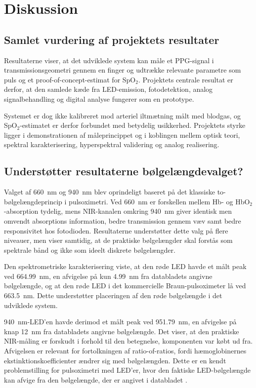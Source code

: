 \chapter{Diskussion}
\label{chap:diskussion}

\section{Samlet vurdering af projektets resultater}
Resultaterne viser, at det udviklede system kan måle et PPG-signal i transmissionsgeometri gennem en finger og udtrække relevante parametre som puls og et proof-of-concept-estimat for SpO$_2$. Projektets centrale resultat er derfor, at den samlede kæde fra LED-emission, fotodetektion, analog signalbehandling og digital analyse fungerer som en prototype.

Systemet er dog ikke kalibreret mod arteriel iltmætning målt med blodgas, og SpO$_2$-estimatet er derfor forbundet med betydelig usikkerhed. Projektets styrke ligger i demonstrationen af måleprincippet og i koblingen mellem optisk teori, spektral karakterisering, hyperspektral validering og analog realisering.

\section{Understøtter resultaterne bølgelængdevalget?}
Valget af \SI{660}{nm} og \SI{940}{nm} blev oprindeligt baseret på det klassiske to-bølgelængdeprincip i pulsoximetri. Ved \SI{660}{nm} er forskellen mellem Hb- og HbO$_2$-absorption tydelig, mens NIR-kanalen omkring \SI{940}{nm} giver identisk men omvendt absorptions information, bedre transmission gennem væv samt bedre responsivitet hos fotodioden. Resultaterne understøtter dette valg på flere niveauer, men viser samtidig, at de praktiske bølgelængder skal forstås som spektrale bånd og ikke som ideelt diskrete bølgelængder.

Den spektrometriske karakterisering viste, at den røde LED havde et målt peak ved \SI{664.99}{nm}, en afvigelse på kun \SI{4.99}{nm} fra databladets angivne bølgelængde, og at den røde LED i det kommercielle Braun-pulsoximeter lå ved \SI{663.5}{nm}. Dette understøtter placeringen af den røde bølgelængde i det udviklede system.

\SI{940}{nm}-LED'en havde derimod et målt peak ved \SI{951.79}{nm}, en afvigelse på knap \SI{12}{nm} fra databladets angivne bølgelængde. Det viser, at den praktiske NIR-måling er forskudt i forhold til den betegnelse, komponenten var købt ud fra. Afvigelsen er relevant for fortolkningen af ratio-of-ratios, fordi hæmoglobinernes ekstinktionskoefficienter ændrer sig med bølgelængden. Dette er en kendt problemstilling for pulsoximetri med LED'er, hvor den faktiske LED-bølgelængde kan afvige fra den bølgelængde, der er angivet i databladet \cite[s.~35]{Webster1997} \cite{Ruberry2025}.

